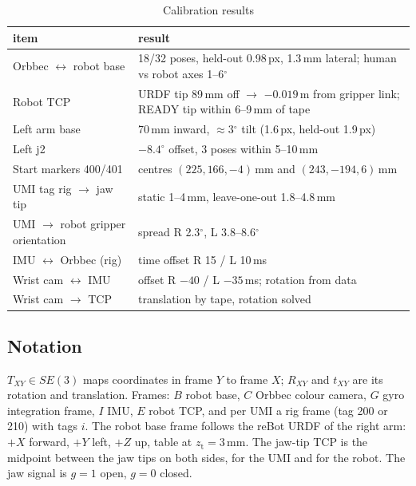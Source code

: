 \documentclass[conference,10pt]{IEEEtran}
\newcommand{\mm}{\,mm\xspace}
\begin{document}
\begin{table}[t]
\caption{Calibration results}\label{tab:cal}
\centering\small
\begin{tabular}{@{}p{}p{}@{}}
\toprule
item & result \\
\midrule
Orbbec $\leftrightarrow$ robot base & 18/32 poses, held-out 0.98\,px, 1.3\mm lateral; human vs robot axes 1--6$^\circ$ \\
Robot TCP & URDF tip 89\mm off $\to$ $-0.019$\,m from gripper link; READY tip within 6--9\mm of tape \\
Left arm base & 70\mm inward, $\approx$3$^\circ$ tilt (1.6\,px, held-out 1.9\,px) \\
Left j2 & $-8.4^\circ$ offset, 3 poses within 5--10\mm \\
Start markers 400/401 & centres $(225, 166, -4)$\mm and $(243, -194, 6)$\mm \\
UMI tag rig $\to$ jaw tip & static 1--4\mm, leave-one-out 1.8--4.8\mm \\
UMI $\to$ robot gripper orientation & spread R 2.3$^\circ$, L 3.8--8.6$^\circ$ \\
IMU $\leftrightarrow$ Orbbec (rig) & time offset R 15 / L 10\,ms \\
Wrist cam $\leftrightarrow$ IMU & offset R $-40$ / L $-35$\,ms; rotation from data \\
Wrist cam $\to$ TCP & translation by tape, rotation solved \\
\bottomrule
\end{tabular}
\end{table}

\subsection{Notation}
$T_{XY}\in SE(3)$ maps coordinates in frame $Y$ to frame $X$; $R_{XY}$ and $t_{XY}$ are its rotation and translation.
Frames: $B$ robot base, $C$ Orbbec colour camera, $G$ gyro integration frame, $I$ IMU, $E$ robot TCP, and per UMI a rig
frame (tag 200 or 210) with tags $i$. The robot base frame follows the reBot URDF of the right arm: $+X$ forward, $+Y$
left, $+Z$ up, table at $z_\mathrm{t}=3$\mm. The jaw-tip TCP is the midpoint between the jaw tips on both sides, for the
UMI and for the robot. The jaw signal is $g=1$ open, $g=0$ closed.
\end{document}
